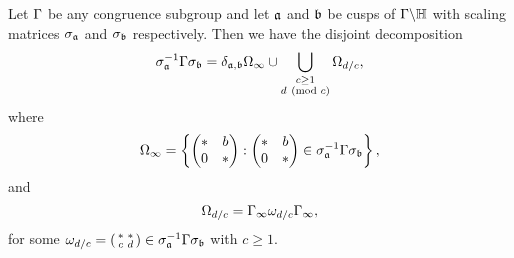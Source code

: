       \begin{theorem}
        Let $\Gamma$ be any congruence subgroup and let $\mathfrak{a}$ and $\mathfrak{b}$ be cusps of $\Gamma\backslash\mathbb{H}$ with scaling matrices $\sigma_{\mathfrak{a}}$ and $\sigma_{\mathfrak{b}}$ respectively. Then we have the disjoint decomposition
        \[
          \sigma_{\mathfrak{a}}^{-1}\Gamma\sigma_{\mathfrak{b}} = \delta_{\mathfrak{a},\mathfrak{b}}\Omega_{\infty}\cup\bigcup_{\substack{c \ge 1 \\ d \ \left(\text{mod }c\right)}}\Omega_{d/c},
        \]
        where
        \[
        \Omega_{\infty} = \left\{\begin{pmatrix} \ast & b \\ 0 & \ast \end{pmatrix}:\begin{pmatrix} \ast & b \\ 0 & \ast \end{pmatrix} \in \sigma_{\mathfrak{a}}^{-1}\Gamma\sigma_{\mathfrak{b}}\right\},
        \]
        and
        \[
          \Omega_{d/c} = \Gamma_{\infty}\omega_{d/c}\Gamma_{\infty},
        \]
        for some $\omega_{d/c} = \begin{psmallmatrix} \ast & \ast \\ c & d \end{psmallmatrix} \in \sigma_{\mathfrak{a}}^{-1}\Gamma\sigma_{\mathfrak{b}}$ with $c \ge 1$.
      \end{theorem}
